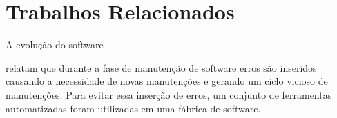 \chapter{Trabalhos Relacionados}\label{trabalhorel}

A evolução do software

 relatam que durante a fase de manutenção de software erros são inseridos causando a necessidade de novas manutenções e gerando um ciclo vicioso de manutenções. Para evitar essa inserção de erros, um conjunto de ferramentas automatizadas foram utilizadas em uma fábrica de software.

	